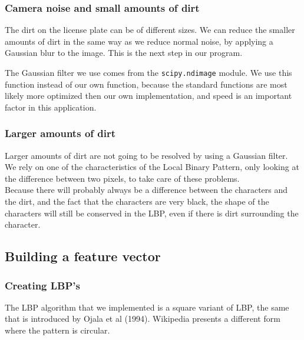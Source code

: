 \documentclass[a4paper]{article}
\begin{document}
\subsubsection{Camera noise and small amounts of dirt}

The dirt on the license plate can be of different sizes. We can reduce the
smaller amounts of dirt in the same way as we reduce normal noise, by applying a
Gaussian blur to the image. This is the next step in our program.

The Gaussian filter we use comes from the \texttt{scipy.ndimage} module. We use
this function instead of our own function, because the standard functions are
most likely more optimized then our own implementation, and speed is an
important factor in this application.


\subsubsection{Larger amounts of dirt}

Larger amounts of dirt are not going to be resolved by using a Gaussian filter.
We rely on one of the characteristics of the Local Binary Pattern, only looking
at the difference between two pixels, to take care of these problems.\\ Because
there will probably always be a difference between the characters and the dirt,
and the fact that the characters are very black, the shape of the characters
will still be conserved in the LBP, even if there is dirt surrounding the
character.


\subsection{Building a feature vector}


\subsubsection{Creating LBP's}

The LBP algorithm that we implemented is a square variant of LBP, the same that
is introduced by Ojala et al (1994). Wikipedia presents a different form where
the pattern is circular.
\end{document}
